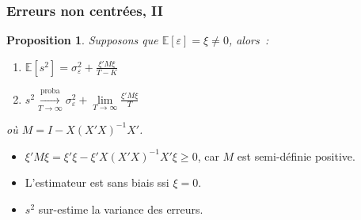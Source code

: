\documentclass[10pt]{beamer}
\newcommand{\plim}{\overset{\text{proba}}{\underset{T\rightarrow\infty}{\longrightarrow}}}
\newcommand{\epsvar}{\sigma_{\varepsilon}^2}
\theoremstyle{plain}
\newtheorem{prop}{Proposition}
\begin{document}
\begin{frame}
  \frametitle{Erreurs non centrées, II}

  \begin{prop}\label{prop:s2:non-zero-mean-error}
    Supposons que $\mathbb E\left[\varepsilon\right] = \xi \neq 0$, alors~:
    \begin{enumerate}

    \item $\mathbb E\left[ s^2 \right] = \epsvar + \frac{\xi'M\xi}{T-K}$
    \item $s^2 \plim \epsvar + \underset{T\rightarrow\infty}{\lim} \frac{\xi'M\xi}{T}$

    \end{enumerate}
    où $M = I - X(X'X)^{-1}X'$.
  \end{prop}

  \bigskip

  \begin{itemize}

  \item  $\xi'M\xi = \xi'\xi - \xi'X(X'X)^{-1}X'\xi\geq 0$, car $M$ est semi-définie positive.\newline

  \item L'estimateur est sans biais ssi $\xi=0$.\newline

  \item $s^2$ sur-estime la variance des erreurs.

  \end{itemize}

\end{frame}
\end{document}
